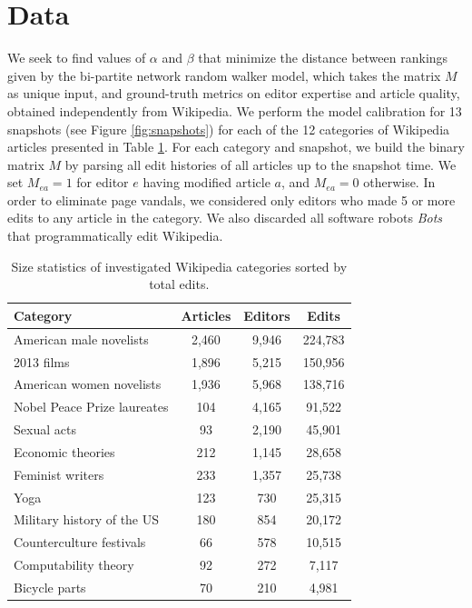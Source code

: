 \section{Data}

We seek to find values of $\alpha$ and $\beta$ that minimize the distance between rankings given by the bi-partite network random walker model, which takes the matrix $M$ as unique input, and ground-truth metrics on editor expertise and article quality, obtained independently from Wikipedia. We perform the model calibration for 13 snapshots (see Figure \ref{fig:snapshots})  for each of  the 12 categories of Wikipedia articles presented in Table \ref{tab:statistics}. For each category and snapshot, we build the binary matrix $M$ by parsing all edit histories of all articles up to the snapshot time. We set $M_{ea} = 1$ for editor $e$ having modified article $a$, and $M_{ea} = 0$ otherwise. In order to eliminate page vandals, we considered only editors who made 5 or more edits to any article in the category. We also discarded all software robots {\it Bots} that programmatically edit Wikipedia. 

\begin{table}
\begin{tabular}{|l|c|c|c|}
\hline
{\bf Category} &  {\bf Articles} &  {\bf Editors} &  {\bf Edits} \\
\hline
American male novelists               &      2,460 &   9,946 &  224,783 \\
2013 films                            &      1,896 &   5,215 &  150,956 \\
American women novelists              &      1,936 &   5,968 &  138,716 \\
Nobel Peace Prize laureates           &       104 &   4,165 &   91,522 \\
Sexual acts                           &        93 &   2,190 &   45,901 \\
Economic theories                     &       212 &   1,145 &   28,658 \\
Feminist writers                      &       233 &   1,357 &   25,738 \\
Yoga                                  &       123 &    730 &   25,315 \\
Military history of the US &       180 &    854 &   20,172 \\
Counterculture festivals              &        66 &    578 &   10,515 \\
Computability theory                  &        92 &    272 &    7,117 \\
Bicycle parts                         &        70 &    210 &    4,981 \\
\hline
\end{tabular}
\caption{Size statistics of investigated Wikipedia categories sorted by total edits.}
\label{tab:statistics}
\end{table}

